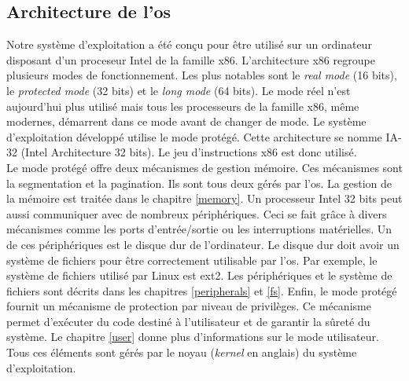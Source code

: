 
\subsection{Architecture de l'\acrshort{os}}
Notre système d'exploitation a été conçu pour être utilisé sur un ordinateur
disposant d'un proceseur Intel de la famille x86. L'architecture x86 regroupe
plusieurs modes de fonctionnement. Les plus notables sont le \textit{real mode}
(16 bits), le \textit{protected mode} (32 bits) et le \textit{long mode} (64 bits).
Le mode réel n'est aujourd'hui plus utilisé mais tous les processeurs de la
famille x86, même modernes, démarrent dans ce mode avant de changer de mode.
Le système d'exploitation développé utilise le mode protégé. Cette architecture
se nomme \acrshort{IA-32} (Intel Architecture 32 bits). Le jeu d'instructions
x86 est donc utilisé. \\

Le mode protégé offre deux mécanismes de gestion mémoire.
Ces mécanismes sont la segmentation et la pagination. Ils sont tous deux gérés
par l'\acrshort{os}. La gestion de la mémoire est traitée dans le chapitre \ref{memory}.
Un processeur Intel 32 bits peut aussi communiquer avec de nombreux périphériques.
Ceci se fait grâce à divers mécanismes comme les ports d'entrée/sortie ou
les interruptions matérielles. Un de ces périphériques est le disque dur de
l'ordinateur. Le disque dur doit avoir un système de fichiers pour être correctement
utilisable par l'\acrshort{os}. Par exemple, le système de fichiers utilisé
par Linux est ext2. Les périphériques et le système de fichiers sont décrits
dans les chapitres \ref{peripherals} et \ref{fs}. Enfin, le mode protégé fournit
un mécanisme de protection par niveau de privilèges. Ce mécanisme permet d'exécuter
du code destiné à l'utilisateur et de garantir la sûreté du système. Le chapitre
\ref{user} donne plus d'informations sur le mode utilisateur. Tous ces éléments
sont gérés par le noyau (\textit{kernel} en anglais) du système d'exploitation.

